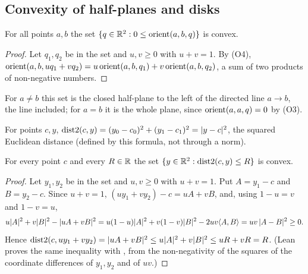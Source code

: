 \subsection{Convexity of half-planes and disks}\label{lg:ssec:convex}

\begin{lemma}\label{lg:lem:halfplane-convex}
For all points $a,b$ the set $\{q\in\mathbb R^2:0\le\operatorname{orient}(a,b,q)\}$ is convex.
\end{lemma}

\begin{proof}
Let $q_1,q_2$ be in the set and $u,v\ge0$ with $u+v=1$. By (O4),
$\operatorname{orient}(a,b,uq_1+vq_2)=u\operatorname{orient}(a,b,q_1)+v\operatorname{orient}(a,b,q_2)$, a sum of two products of non-negative numbers.
\end{proof}

For $a\ne b$ this set is the closed half-plane to the left of the directed line $a\to b$, the line included; for
$a=b$ it is the whole plane, since $\operatorname{orient}(a,a,q)=0$ by (O3).

\begin{definition}\label{lg:def:dist2}
For points $c,y$, $\operatorname{dist2}(c,y)=(y_0-c_0)^2+(y_1-c_1)^2=\lvert y-c\rvert^2$, the squared Euclidean distance
(defined by this formula, not through a norm).
\end{definition}

\begin{lemma}\label{lg:lem:disk}
For every point $c$ and every $R\in\mathbb R$ the set $\{y\in\mathbb R^2:\operatorname{dist2}(c,y)\le R\}$ is convex.
\end{lemma}

\begin{proof}
Let $y_1,y_2$ be in the set and $u,v\ge0$ with $u+v=1$. Put $A=y_1-c$ and $B=y_2-c$. Since $u+v=1$,
$(uy_1+vy_2)-c=uA+vB$, and, using $1-u=v$ and $1-v=u$,
\[
  u\lvert A\rvert^2+v\lvert B\rvert^2-\lvert uA+vB\rvert^2=u(1-u)\lvert A\rvert^2+v(1-v)\lvert B\rvert^2-2uv\langle A,B\rangle=uv\,\lvert A-B\rvert^2\ge0.
\]
Hence $\operatorname{dist2}(c,uy_1+vy_2)=\lvert uA+vB\rvert^2\le u\lvert A\rvert^2+v\lvert B\rvert^2\le uR+vR=R$. (Lean proves the same
inequality with , from the non-negativity of the squares of the coordinate differences of $y_1,y_2$ and
of $uv$.)
\end{proof}

